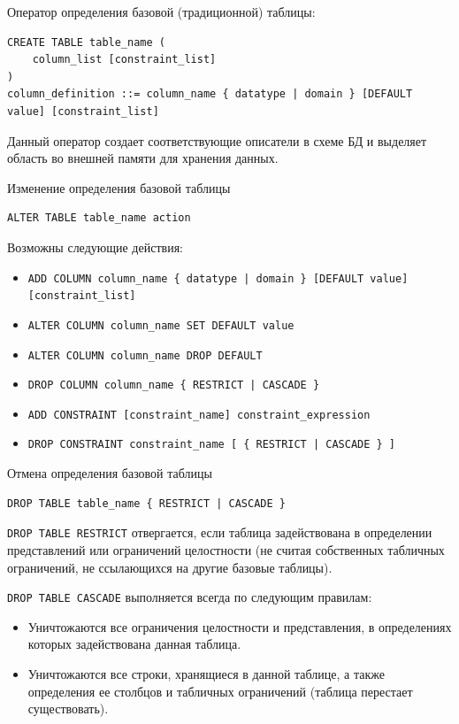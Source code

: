 \documentclass[a4paper,12pt]{article}
\begin{document}
Оператор определения базовой (традиционной) таблицы:  
\begin{lstlisting}
CREATE TABLE table_name (
    column_list [constraint_list]
)
column_definition ::= column_name { datatype | domain } [DEFAULT value] [constraint_list]
\end{lstlisting}

Данный оператор создает соответствующие описатели в схеме БД и выделяет область во внешней памяти для хранения данных.

Изменение определения базовой таблицы  
\begin{lstlisting}
ALTER TABLE table_name action
\end{lstlisting}

Возможны следующие действия:  
\begin{itemize}
    \item \texttt{ADD COLUMN column\_name \{ datatype | domain \} [DEFAULT value] [constraint\_list]}
    \item \texttt{ALTER COLUMN column\_name SET DEFAULT value}
    \item \texttt{ALTER COLUMN column\_name DROP DEFAULT}
    \item \texttt{DROP COLUMN column\_name \{ RESTRICT | CASCADE \}}
    \item \texttt{ADD CONSTRAINT [constraint\_name] constraint\_expression}
    \item \texttt{DROP CONSTRAINT constraint\_name [ \{ RESTRICT | CASCADE \} ]}
\end{itemize}

Отмена определения базовой таблицы  
\begin{lstlisting}
DROP TABLE table_name { RESTRICT | CASCADE }
\end{lstlisting}

\texttt{DROP TABLE RESTRICT} отвергается, если таблица задействована в определении представлений или ограничений целостности (не считая собственных табличных ограничений, не ссылающихся на другие базовые таблицы).

\texttt{DROP TABLE CASCADE} выполняется всегда по следующим правилам:
\begin{itemize}
    \item Уничтожаются все ограничения целостности и представления, в определениях которых задействована данная таблица.
    \item Уничтожаются все строки, хранящиеся в данной таблице, а также определения ее столбцов и табличных ограничений (таблица перестает существовать).
\end{itemize}
\end{document}
